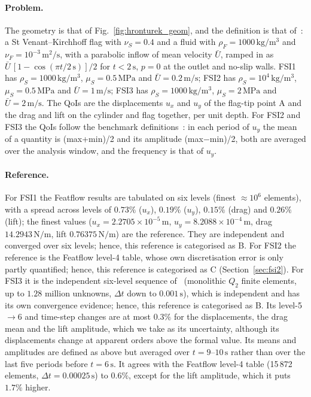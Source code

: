 \paragraph{Problem.}
The geometry is that of Fig.~\ref{fig:hronturek_geom}, and the definition is that of~\citet{Turek2006}: a St Venant--Kirchhoff flag with $\nu_S = 0.4$ and a fluid with $\rho_F = 1000\,\mathrm{kg/m^3}$ and $\nu_F = 10^{-3}\,\mathrm{m^2/s}$, with a parabolic inflow of mean velocity $\bar{U}$, ramped in as $\bar{U}\,[1 - \cos(\pi t/2\,\mathrm{s})]/2$ for $t < 2\,\mathrm{s}$, $p = 0$ at the outlet and no-slip walls.
FSI1 has $\rho_S = 1000\,\mathrm{kg/m^3}$, $\mu_S = 0.5\,\mathrm{MPa}$ and $\bar{U} = 0.2\,\mathrm{m/s}$; FSI2 has $\rho_S = 10^4\,\mathrm{kg/m^3}$, $\mu_S = 0.5\,\mathrm{MPa}$ and $\bar{U} = 1\,\mathrm{m/s}$; FSI3 has $\rho_S = 1000\,\mathrm{kg/m^3}$, $\mu_S = 2\,\mathrm{MPa}$ and $\bar{U} = 2\,\mathrm{m/s}$.
The QoIs are the displacements $u_x$ and $u_y$ of the flag-tip point A and the drag and lift on the cylinder and flag together, per unit depth.
For FSI2 and FSI3 the QoIs follow the benchmark definitions~\citep{Turek2006}: in each period of $u_y$ the mean of a quantity is (max+min)/2 and its amplitude (max$-$min)/2, both are averaged over the analysis window, and the frequency is that of $u_y$.

\paragraph{Reference.}
For FSI1 the Featflow results are tabulated on six levels (finest $\approx10^6$ elements), with a spread across levels of $0.73\%$ ($u_x$), $0.19\%$ ($u_y$), $0.15\%$ (drag) and $0.26\%$ (lift); the finest values ($u_x = 2.2705\times10^{-5}\,\mathrm{m}$, $u_y = 8.2088\times10^{-4}\,\mathrm{m}$, drag $14.2943\,\mathrm{N/m}$, lift $0.76375\,\mathrm{N/m}$) are the reference. They are independent and converged over six levels; hence, this reference is categorised as B.
For FSI2 the reference is the Featflow level-4 table, whose own discretisation error is only partly quantified; hence, this reference is categorised as C (Section~\ref{sec:fsi2}).
For FSI3 it is the independent six-level sequence of~\citet{Failer2020} (monolithic $Q_2$ finite elements, up to $1.28$ million unknowns, $\Delta t$ down to $0.001\,\mathrm{s}$), which is independent and has its own convergence evidence; hence, this reference is categorised as B. Its level-5$\to$6 and time-step changes are at most $0.3\%$ for the displacements, the drag mean and the lift amplitude, which we take as its uncertainty, although its displacements change at apparent orders above the formal value. Its means and amplitudes are defined as above but averaged over $t = 9$--$10\,\mathrm{s}$ rather than over the last five periods before $t = 6\,\mathrm{s}$. It agrees with the Featflow level-4 table (15\,872 elements, $\Delta t = 0.00025\,\mathrm{s}$) to $0.6\%$, except for the lift amplitude, which it puts $1.7\%$ higher.

